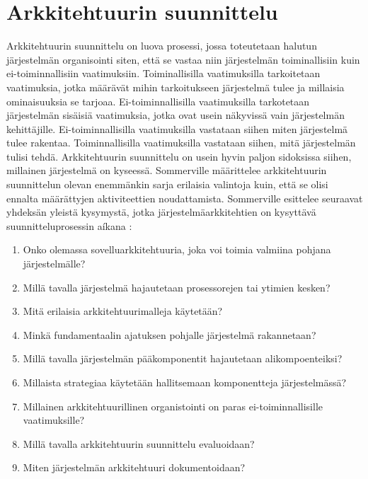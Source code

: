 \documentclass[utf8]{gradu3}
\begin{document}
\section{Arkkitehtuurin suunnittelu}

Arkkitehtuurin suunnittelu on luova prosessi, jossa toteutetaan halutun järjestelmän organisointi siten, että se vastaa niin järjestelmän toiminallisiin kuin ei-toiminnallisiin vaatimuksiin. Toiminallisilla vaatimuksilla tarkoitetaan vaatimuksia, jotka määrävät mihin tarkoitukseen järjestelmä tulee ja millaisia ominaisuuksia se tarjoaa. Ei-toiminnallisilla vaatimuksilla tarkotetaan järjestelmän sisäisiä vaatimuksia, jotka ovat usein näkyvissä vain järjestelmän kehittäjille. Ei-toiminnallisilla vaatimuksilla vastataan siihen miten järjestelmä tulee rakentaa. Toiminnallisilla vaatimuksilla vastataan siihen, mitä järjestelmän tulisi tehdä.  Arkkitehtuurin suunnittelu on usein hyvin paljon sidoksissa siihen, millainen järjestelmä on kyseessä. Sommerville määrittelee arkkitehtuurin suunnittelun olevan enemmänkin sarja erilaisia valintoja kuin, että se olisi ennalta määrättyjen aktiviteettien noudattamista. Sommerville esittelee seuraavat yhdeksän yleistä kysymystä, jotka järjestelmäarkkitehtien on kysyttävä suunnitteluprosessin aíkana \parencite[s. 151]{Sommerville}:

\begin{enumerate}  
\item Onko olemassa sovelluarkkitehtuuria, joka voi toimia valmiina pohjana järjestelmälle?
\item Millä tavalla järjestelmä hajautetaan prosessorejen tai ytimien kesken?
\item Mitä erilaisia arkkitehtuurimalleja käytetään?
\item Minkä fundamentaalin ajatuksen pohjalle järjestelmä rakannetaan?
\item Millä tavalla järjestelmän pääkomponentit hajautetaan alikompoenteiksi?
\item Millaista strategiaa käytetään hallitsemaan komponentteja järjestelmässä?
\item Millainen arkkitehtuurillinen organistointi on paras ei-toiminnallisille vaatimuksille?
\item Millä tavalla arkkitehtuurin suunnittelu evaluoidaan?
\item Miten järjestelmän arkkitehtuuri dokumentoidaan?
\end{enumerate}
\end{document}
